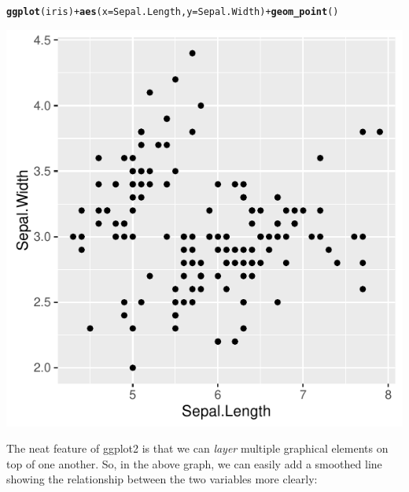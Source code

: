 \documentclass[12pt]{article}\usepackage[]{graphicx}\usepackage[]{color}
\makeatletter
\def\maxwidth{ %
  \ifdim\Gin@nat@width>\linewidth
    \linewidth
  \else
    \Gin@nat@width
  \fi
}
\newcommand{\hlopt}[1]{\textcolor[rgb]{0,0,0}{#1}}%
\newcommand{\hlstd}[1]{\textcolor[rgb]{0.345,0.345,0.345}{#1}}%
\newcommand{\hlkwc}[1]{\textcolor[rgb]{0.333,0.667,0.333}{#1}}%
\newcommand{\hlkwd}[1]{\textcolor[rgb]{0.737,0.353,0.396}{\textbf{#1}}}%
\newenvironment{kframe}{%
 \def\at@end@of@kframe{}%
 \ifinner\ifhmode%
  \def\at@end@of@kframe{\end{minipage}}%
  \begin{minipage}{\columnwidth}%
 \fi\fi%
 \def\FrameCommand##1{\hskip\@totalleftmargin \hskip-\fboxsep
 \colorbox{shadecolor}{##1}\hskip-\fboxsep
     \hskip-\linewidth \hskip-\@totalleftmargin \hskip\columnwidth}%
 \MakeFramed {\advance\hsize-\width
   \@totalleftmargin\z@ \linewidth\hsize
   \@setminipage}}%
 {\par\unskip\endMakeFramed%
 \at@end@of@kframe}
\newenvironment{knitrout}{}{} %
\makeatother
\begin{document}
\begin{knitrout}
\color{fgcolor}\begin{kframe}
\begin{alltt}
\hlkwd{ggplot}\hlstd{(iris)} \hlopt{+} \hlkwd{aes}\hlstd{(}\hlkwc{x} \hlstd{= Sepal.Length,} \hlkwc{y} \hlstd{= Sepal.Width)} \hlopt{+} \hlkwd{geom_point}\hlstd{()}
\end{alltt}
\end{kframe}
\includegraphics[width=\maxwidth]{figure/unnamed-chunk-4-1} 

\end{knitrout}

The neat feature of ggplot2 is that we can \textit{layer} multiple graphical elements on top of one another. So, in the above graph, we can easily add a smoothed line showing the relationship between the two variables more clearly:
\end{document}
